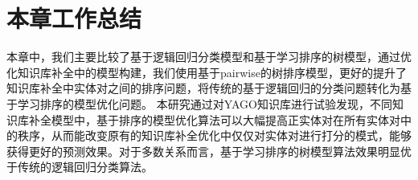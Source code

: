 \section{本章工作总结}
本章中，我们主要比较了基于逻辑回归分类模型和基于学习排序的树模型，通过优化知识库补全中的模型构建，我们使用基于pairwise的树排序模型，更好的提升了知识库补全中实体对之间的排序问题，将传统的基于逻辑回归的分类问题转化为基于学习排序的模型优化问题。
本研究通过对YAGO知识库进行试验发现，不同知识库补全模型中，基于排序的模型优化算法可以大幅提高正实体对在所有实体对中的秩序，从而能改变原有的知识库补全优化中仅仅对实体对进行打分的模式，能够获得更好的预测效果。对于多数关系而言，基于学习排序的树模型算法效果明显优于传统的逻辑回归分类算法。
